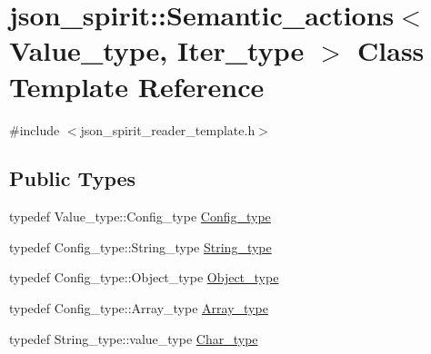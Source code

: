 \hypertarget{classjson__spirit_1_1_semantic__actions}{}\section{json\+\_\+spirit\+:\+:Semantic\+\_\+actions$<$ Value\+\_\+type, Iter\+\_\+type $>$ Class Template Reference}
\label{classjson__spirit_1_1_semantic__actions}


{\ttfamily \#include $<$json\+\_\+spirit\+\_\+reader\+\_\+template.\+h$>$}

\subsection*{Public Types}
\begin{DoxyCompactItemize}
\item 
typedef Value\+\_\+type\+::\+Config\+\_\+type \hyperlink{classjson__spirit_1_1_semantic__actions_ac131d112e94a0861e12253a0dc5a7036}{Config\+\_\+type}
\item 
typedef Config\+\_\+type\+::\+String\+\_\+type \hyperlink{classjson__spirit_1_1_semantic__actions_a3e726d04ba8bf36d2b1a16d7243f771c}{String\+\_\+type}
\item 
typedef Config\+\_\+type\+::\+Object\+\_\+type \hyperlink{classjson__spirit_1_1_semantic__actions_a2a1b932809452028f780b706442bc69c}{Object\+\_\+type}
\item 
typedef Config\+\_\+type\+::\+Array\+\_\+type \hyperlink{classjson__spirit_1_1_semantic__actions_ae45b36c7c39d00d084532a9de4aaf53e}{Array\+\_\+type}
\item 
typedef String\+\_\+type\+::value\+\_\+type \hyperlink{classjson__spirit_1_1_semantic__actions_a14acf53ba844eb982d4e109687e501d2}{Char\+\_\+type}
\end{DoxyCompactItemize}
